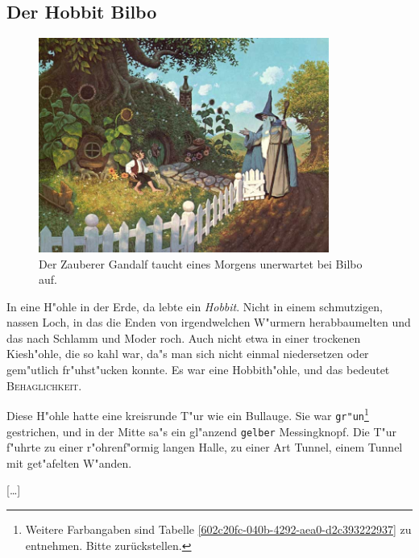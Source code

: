 \documentclass[a4paper]{article}
\begin{document}
\subsection{Der Hobbit Bilbo}
%
\begin{figure}[h]
\centering
%
\includegraphics[width=0.85\textwidth]{besuch}
\caption[Unerwarteter Besuch bei Bilbo]{Der Zauberer Gandalf taucht eines
Morgens unerwartet bei Bilbo auf.}
\label{fig:besuch}
\end{figure}
In eine H"ohle in der Erde, da lebte ein \emph{Hobbit}. Nicht in einem 
schmutzigen, nassen Loch, in das die Enden von irgendwelchen W"urmern 
herabbaumelten und das nach Schlamm und Moder roch. Auch nicht etwa in einer 
trockenen Kiesh"ohle, die so kahl war, da"s man sich nicht einmal niedersetzen
oder gem"utlich fr"uhst"ucken konnte. Es war eine Hobbith"ohle, und das
bedeutet \textsc{Behaglichkeit.}

Diese H"ohle hatte eine kreisrunde T"ur wie ein Bullauge. Sie war 
\texttt{gr"un}\footnote{Weitere Farbangaben sind Tabelle \ref{602c20fc-040b-4292-aea0-d2c393222937} zu entnehmen. Bitte zurückstellen.} gestrichen, und in der Mitte sa"s ein gl"anzend \texttt{gelber}
Messingknopf. Die T"ur f"uhrte zu einer r"ohrenf"ormig langen Halle, zu einer 
Art Tunnel, einem Tunnel mit get"afelten W"anden.

[\dots]
\end{document}
